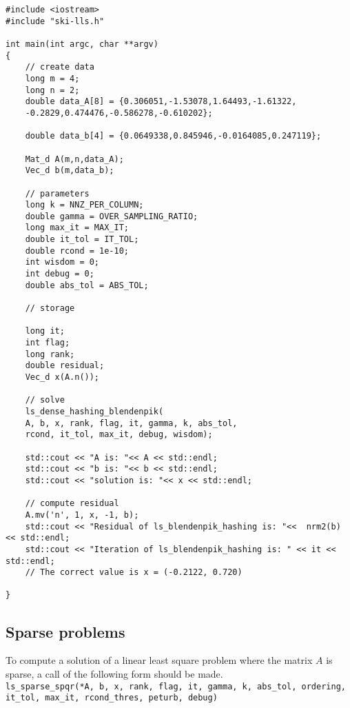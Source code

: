 \documentclass[english,11pt]{article}
\begin{document}
\begin{lstlisting}[breaklines=true, showstringspaces=false]
#include <iostream>
#include "ski-lls.h" 

int main(int argc, char **argv)
{
	// create data
	long m = 4;
	long n = 2;
	double data_A[8] = {0.306051,-1.53078,1.64493,-1.61322,
	-0.2829,0.474476,-0.586278,-0.610202}; 

	double data_b[4] = {0.0649338,0.845946,-0.0164085,0.247119};

	Mat_d A(m,n,data_A);
	Vec_d b(m,data_b);

	// parameters
	long k = NNZ_PER_COLUMN;
	double gamma = OVER_SAMPLING_RATIO;
	long max_it = MAX_IT;
	double it_tol = IT_TOL;
	double rcond = 1e-10;
	int wisdom = 0;
	int debug = 0;
	double abs_tol = ABS_TOL;

	// storage

	long it;
	int flag;
	long rank;
	double residual;   
	Vec_d x(A.n());

	// solve
	ls_dense_hashing_blendenpik(
	A, b, x, rank, flag, it, gamma, k, abs_tol, 
	rcond, it_tol, max_it, debug, wisdom);

	std::cout << "A is: "<< A << std::endl;
	std::cout << "b is: "<< b << std::endl;
	std::cout << "solution is: "<< x << std::endl;

	// compute residual
	A.mv('n', 1, x, -1, b); 
	std::cout << "Residual of ls_blendenpik_hashing is: "<<  nrm2(b) << std::endl;
	std::cout << "Iteration of ls_blendenpik_hashing is: " << it << std::endl;
	// The correct value is x = (-0.2122, 0.720)

}
\end{lstlisting}


\subsection{Sparse problems}

To compute a solution of a linear least square problem where the matrix $A$ is sparse, a call of the following form should be made. \\

{\tt ls_sparse_spqr(*A, b, x, 
    rank, flag, it, gamma, k, abs_tol, ordering, it_tol, max_it, rcond_{thres}, peturb, debug)}
\end{document}

